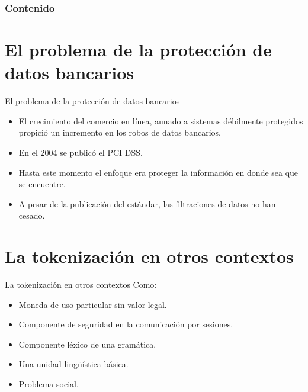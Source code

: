 \documentclass{beamer}
\begin{document}
  {
  \frame{\titlepage}}

  \begin{frame}
    \frametitle{Contenido}
    \setcounter{tocdepth}{1}
    \tableofcontents
  \end{frame}

  \setlength{\parskip}{0.5em}

  \section{El problema de la protección de datos bancarios}

  \begin{frame}{El problema de la protección de datos bancarios}
    \begin{itemize}
      \item El crecimiento del comercio en línea, aunado a sistemas débilmente
        protegidos propició un incremento en los robos de datos bancarios.
      \item En el 2004 se publicó el PCI DSS\footnotemark \cite{pci_dss}.
      \item Hasta este momento el enfoque era proteger la información en donde
        sea que se encuentre.
      \item A pesar de la publicación del estándar, las filtraciones de datos
        no han cesado.

    \end{itemize}
  \end{frame}

  \section{La tokenización en otros contextos}

  \begin{frame}{La tokenización en otros contextos}
    Como:
    \begin{itemize}
      \item Moneda de uso particular sin valor legal.
      \item Componente de seguridad en la comunicación por sesiones.
      \item Componente léxico de una gramática.
      \item Una unidad lingüística básica.
      \item Problema social.
    \end{itemize}
  \end{frame}
\end{document}
